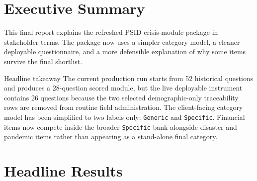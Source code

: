 \documentclass[12pt]{article}
\begin{document}
\makecover

\section{Executive Summary}

This final report explains the refreshed PSID crisis-module package in stakeholder terms. The package now uses a simpler category model, a cleaner deployable questionnaire, and a more defensible explanation of why some items survive the final shortlist.

\begin{psidbox}{Headline takeaway}
The current production run starts from 52 historical questions and produces a 28-question scored module, but the live deployable instrument contains 26 questions because the two selected demographic-only traceability rows are removed from routine field administration. The client-facing category model has been simplified to two labels only: \texttt{Generic} and \texttt{Specific}. Financial items now compete inside the broader \texttt{Specific} bank alongside disaster and pandemic items rather than appearing as a stand-alone final category.
\end{psidbox}

\section{Headline Results}
\end{document}
